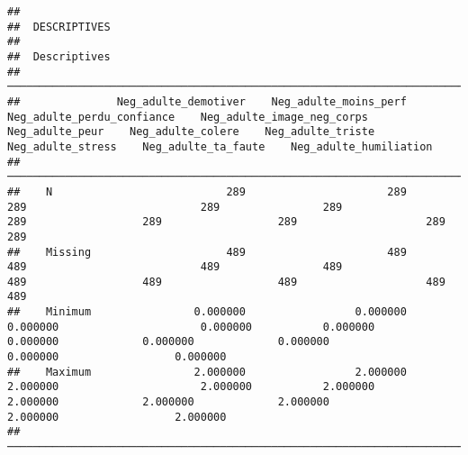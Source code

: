 \documentclass[
]{article}
\begin{document}
\begin{verbatim}
## 
##  DESCRIPTIVES
## 
##  Descriptives                                                                                                                                                                                                                                                
##  ─────────────────────────────────────────────────────────────────────────────────────────────────────────────────────────────────────────────────────────────────────────────────────────────────────────────────────────────────────────────────────────── 
##               Neg_adulte_demotiver    Neg_adulte_moins_perf    Neg_adulte_perdu_confiance    Neg_adulte_image_neg_corps    Neg_adulte_peur    Neg_adulte_colere    Neg_adulte_triste    Neg_adulte_stress    Neg_adulte_ta_faute    Neg_adulte_humiliation   
##  ─────────────────────────────────────────────────────────────────────────────────────────────────────────────────────────────────────────────────────────────────────────────────────────────────────────────────────────────────────────────────────────── 
##    N                           289                      289                           289                           289                289                  289                  289                  289                    289                       289   
##    Missing                     489                      489                           489                           489                489                  489                  489                  489                    489                       489   
##    Minimum                0.000000                 0.000000                      0.000000                      0.000000           0.000000             0.000000             0.000000             0.000000               0.000000                  0.000000   
##    Maximum                2.000000                 2.000000                      2.000000                      2.000000           2.000000             2.000000             2.000000             2.000000               2.000000                  2.000000   
##  ───────────────────────────────────────────────────────────────────────────────────────────────────────────────────────────────────────────────────────────────────────────────────────────────────────────────────────────────────────────────────────────
\end{verbatim}
\end{document}

